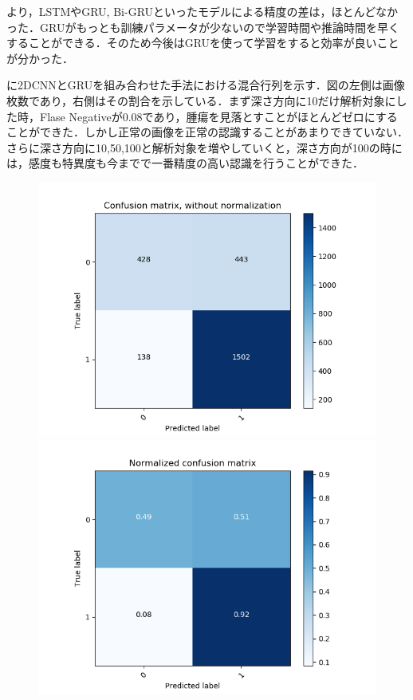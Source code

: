 より，LSTMやGRU, Bi-GRUといったモデルによる精度の差は，ほとんどなかった．GRUがもっとも訓練パラメータが少ないので学習時間や推論時間を早くすることができる．そのため今後はGRUを使って学習をすると効率が良いことが分かった．

に2DCNNとGRUを組み合わせた手法における混合行列を示す．図の左側は画像枚数であり，右側はその割合を示している．まず深さ方向に10だけ解析対象にした時，Flase Negativeが0.08であり，腫瘍を見落とすことがほとんどゼロにすることができた．しかし正常の画像を正常の認識することがあまりできていない．さらに深さ方向に10,50,100と解析対象を増やしていくと，深さ方向が100の時には，感度も特異度も今までで一番精度の高い認識を行うことができた．


\begin{figure}[H]
	\centering
	\begin{minipage}[b]{\columnwidth}
		\centering
		\includegraphics[clip, width=0.45\linewidth]{fig/chapter4/3d/confusion_matrix/count_confusion_matrix_False_10_gru}
		\includegraphics[clip, width=0.45\linewidth]{fig/chapter4/3d/confusion_matrix/normalized_confusion_matrix_False_10_gru}
		\label{fig:}
	\end{minipage}


\end{figure}
